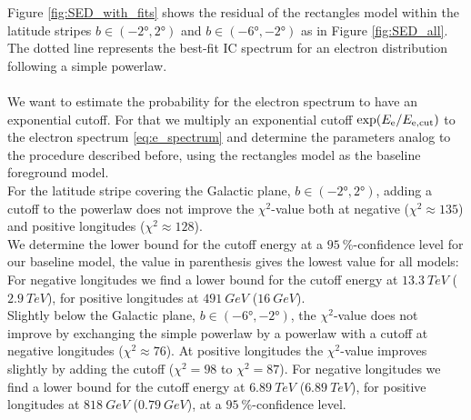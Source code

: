 Figure \ref{fig:SED_with_fits} shows the residual of the rectangles model within the latitude stripes $b \in (-\ang{2}, \ang{2})$ and $b \in (-\ang{6}, -\ang{2})$ as in Figure \ref{fig:SED_all}. The dotted line represents the best-fit IC spectrum for an electron distribution following a simple powerlaw.  \\
\\
We want to estimate the probability for the electron spectrum to have an exponential cutoff. For that we multiply an exponential cutoff $\exp(E_{\text{e}} / E_{\text{e},\text{cut}})$ to the electron spectrum \eqref{eq:e_spectrum} and determine the parameters analog to the procedure described before, using the rectangles model as the baseline foreground model.\\
For the latitude stripe covering the Galactic plane, $b \in (-\ang{2}, \ang{2})$, adding a cutoff to the powerlaw does not improve the $\chi^2$-value both at negative ($\chi^2 \approx 135$) and positive longitudes ($\chi^2 \approx 128$).\\
We determine the lower bound for the cutoff energy at a $\SI{95}{\percent}$-confidence level for our baseline model, the value in parenthesis gives the lowest value for all models: For negative longitudes we find a lower bound for the cutoff energy at $\SI{13.3}{TeV}$ ($\SI{2.9}{TeV}$), for positive longitudes at $\SI{491}{GeV}$ ($\SI{16}{GeV}$).\\
Slightly below the Galactic plane, $b \in (-\ang{6}, -\ang{2})$, the $\chi^2$-value does not improve by exchanging the simple powerlaw by a powerlaw with a cutoff at negative longitudes ($\chi^2 \approx 76$). At positive longitudes the $\chi^2$-value improves slightly by adding the cutoff ($\chi^2 = 98$ to $\chi^2 = 87$). For negative longitudes we find a lower bound for the cutoff energy at $\SI{6.89}{TeV}$ ($\SI{6.89}{TeV}$), for positive longitudes at $\SI{818}{GeV}$ ($\SI{0.79}{GeV}$), at a $\SI{95}{\percent}$-confidence level.\\
\\
